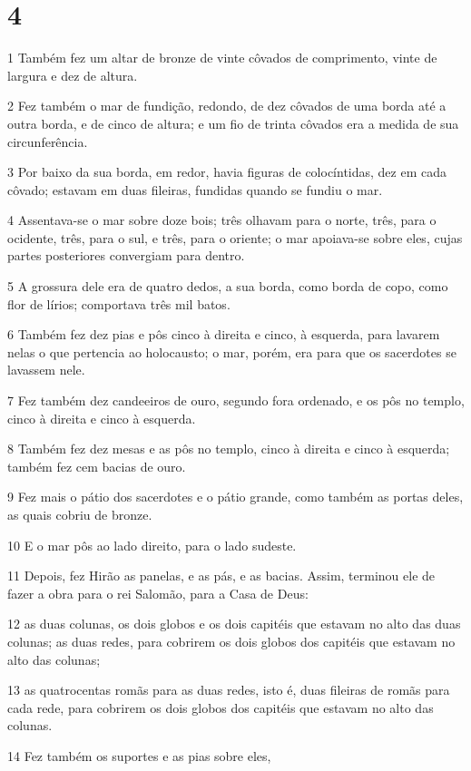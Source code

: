 \chapter{4}

\par 1 Também fez um altar de bronze de vinte côvados de comprimento, vinte de largura e dez de altura.
\par 2 Fez também o mar de fundição, redondo, de dez côvados de uma borda até a outra borda, e de cinco de altura; e um fio de trinta côvados era a medida de sua circunferência.
\par 3 Por baixo da sua borda, em redor, havia figuras de colocíntidas, dez em cada côvado; estavam em duas fileiras, fundidas quando se fundiu o mar.
\par 4 Assentava-se o mar sobre doze bois; três olhavam para o norte, três, para o ocidente, três, para o sul, e três, para o oriente; o mar apoiava-se sobre eles, cujas partes posteriores convergiam para dentro.
\par 5 A grossura dele era de quatro dedos, a sua borda, como borda de copo, como flor de lírios; comportava três mil batos.
\par 6 Também fez dez pias e pôs cinco à direita e cinco, à esquerda, para lavarem nelas o que pertencia ao holocausto; o mar, porém, era para que os sacerdotes se lavassem nele.
\par 7 Fez também dez candeeiros de ouro, segundo fora ordenado, e os pôs no templo, cinco à direita e cinco à esquerda.
\par 8 Também fez dez mesas e as pôs no templo, cinco à direita e cinco à esquerda; também fez cem bacias de ouro.
\par 9 Fez mais o pátio dos sacerdotes e o pátio grande, como também as portas deles, as quais cobriu de bronze.
\par 10 E o mar pôs ao lado direito, para o lado sudeste.
\par 11 Depois, fez Hirão as panelas, e as pás, e as bacias. Assim, terminou ele de fazer a obra para o rei Salomão, para a Casa de Deus:
\par 12 as duas colunas, os dois globos e os dois capitéis que estavam no alto das duas colunas; as duas redes, para cobrirem os dois globos dos capitéis que estavam no alto das colunas;
\par 13 as quatrocentas romãs para as duas redes, isto é, duas fileiras de romãs para cada rede, para cobrirem os dois globos dos capitéis que estavam no alto das colunas.
\par 14 Fez também os suportes e as pias sobre eles,
